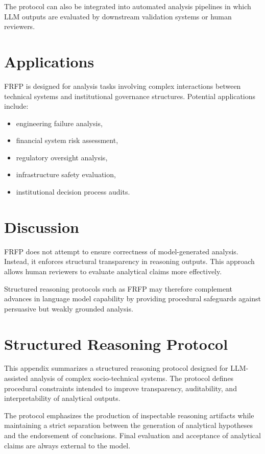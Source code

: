 The protocol can also be integrated into automated analysis pipelines in which LLM outputs are evaluated by downstream validation systems or human reviewers.

\section{Applications}

FRFP is designed for analysis tasks involving complex interactions between technical systems and institutional governance structures. Potential applications include:

\begin{itemize}
\item engineering failure analysis,
\item financial system risk assessment,
\item regulatory oversight analysis,
\item infrastructure safety evaluation,
\item institutional decision process audits.
\end{itemize}

\section{Discussion}

FRFP does not attempt to ensure correctness of model-generated analysis. Instead, it enforces structural transparency in reasoning outputs. This approach allows human reviewers to evaluate analytical claims more effectively.

Structured reasoning protocols such as FRFP may therefore complement advances in language model capability by providing procedural safeguards against persuasive but weakly grounded analysis.

\appendix

\section{Structured Reasoning Protocol}
\renewcommand{\appendixname}{}
This appendix summarizes a structured reasoning protocol designed for
LLM-assisted analysis of complex socio-technical systems. The protocol
defines procedural constraints intended to improve transparency,
auditability, and interpretability of analytical outputs.

The protocol emphasizes the production of inspectable reasoning artifacts
while maintaining a strict separation between the generation of analytical
hypotheses and the endorsement of conclusions. Final evaluation and
acceptance of analytical claims are always external to the model.

